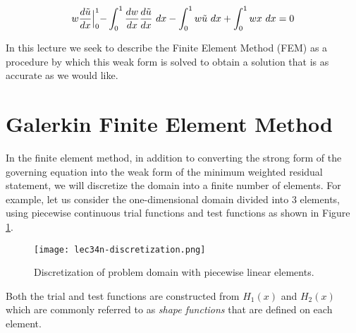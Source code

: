 \begin{equation*}
w \frac{d \tilde u}{dx}\Bigl|_{0}^{1}-\int_{0}^{1}\frac{dw}{dx}\frac{d\tilde{u}}{dx} \ dx - \int_{0}^{1}w \tilde{u} \ dx + \int_{0}^{1} wx \ dx = 0
\end{equation*}

\vspace{0.25cm}

\noindent In this lecture we seek to describe the Finite Element Method (FEM) as a procedure by which this weak form is solved to obtain a solution that is as accurate as we would like.

\section{Galerkin Finite Element Method}

In the finite element method, in addition to converting the strong form of the governing equation into the weak form of the minimum weighted residual statement, we will discretize the domain into a finite number of elements. For example, let us consider the one-dimensional domain divided into 3 elements, using piecewise continuous trial functions and test functions as shown in Figure \ref{fig:lec34n-discretization}.

\begin{figure}[h!]
\texttt{[image: lec34n-discretization.png]}
\caption{Discretization of problem domain with piecewise linear elements.}
\label{fig:lec34n-discretization}
\end{figure}
\noindent Both the trial and test functions are constructed from $H_1(x)$ and $H_2(x)$ which are commonly referred to as \emph{shape functions} that are defined on each element.

